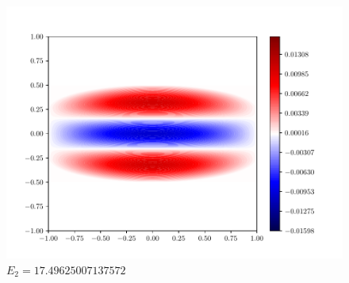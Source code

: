 \documentclass{article}
\begin{document}
\begin{enumerate}[1.]
\begin{enumerate}[(A)]
\begin{enumerate}[(i)]
\begin{figure}[H]
\begin{minipage}{0.3\linewidth}
          \includegraphics[width=\linewidth]{q6c-2.pdf}
          \caption*{$E_2= 17.49625007137572$}
        \end{minipage}


\end{figure}
\end{enumerate}
\end{enumerate}
\end{enumerate}
\end{document}
